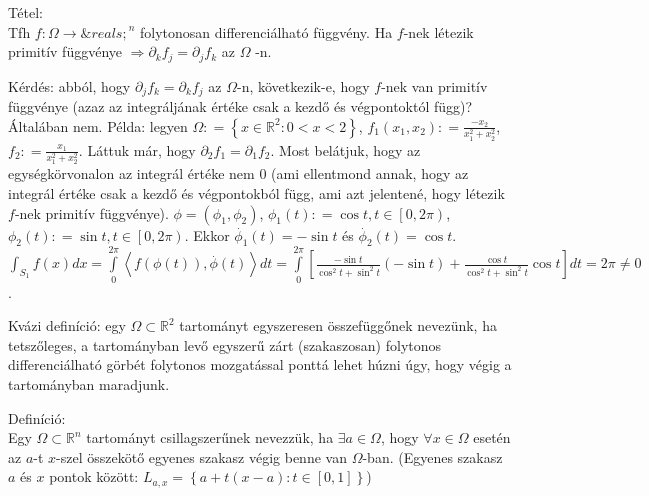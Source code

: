 \documentclass[12pt,a4paper]{scrartcl}
\newenvironment{definicio}{}{}
\newenvironment{tetel}{}{}
\begin{document}
\begin{tetel}

Tétel:\\
Tfh \(\left. f:\Omega\rightarrow{\& reals;}^{n} \right.\) folytonosan
differenciálható függvény. Ha \(f\)-nek létezik primitív függvénye
\(\left. \Rightarrow\partial_{k}f_{j} = \partial_{j}f_{k} \right.\) az
\(\Omega\) -n.

\end{tetel}

Kérdés: abból, hogy \(\partial_{j}f_{k} = \partial_{k}f_{j}\) az
\(\Omega\)-n, következik-e, hogy \(f\)-nek van primitív függvénye (azaz
az integráljának értéke csak a kezdő és végpontoktól függ)? Általában
nem. Példa: legyen
\(\Omega: = \left\{ {x \in {\mathbb{R}}^{2}:0 < x < 2} \right\}\),
\(f_{1}\left( {x_{1},x_{2}} \right): = \frac{- x_{2}}{x_{1}^{2} + x_{2}^{2}}\),
\(f_{2}: = \frac{x_{1}}{x_{1}^{2} + x_{2}^{2}}\). Láttuk már, hogy
\(\partial_{2}f_{1} = \partial_{1}f_{2}\). Most belátjuk, hogy az
egységkörvonalon az integrál értéke nem 0 (ami ellentmond annak, hogy az
integrál értéke csak a kezdő és végpontokból függ, ami azt jelentené,
hogy létezik \(f\)-nek primitív függvénye).
\(\phi = \left( {\phi_{1},\phi_{2}} \right)\),
\(\phi_{1}\left( t \right): = \cos t,t \in \left\lbrack {0,2\pi} \right)\),
\(\phi_{2}\left( t \right): = \sin t,t \in \left\lbrack {0,2\pi} \right)\).
Ekkor \({\overset{.}{\phi}}_{1}\left( t \right) = - \sin t\) és
\({\overset{.}{\phi}}_{2}\left( t \right) = \cos t\).
\({\int_{S_{1}}{f\left( x \right)dx}} = {\int\limits_{0}^{2\pi}{\left\langle {f\left( {\phi\left( t \right)} \right),\overset{.}{\phi}\left( t \right)} \right\rangle dt}} = {\int\limits_{0}^{2\pi}{\left\lbrack {\frac{- \sin t}{\cos^{2}t + \sin^{2}t}\left( {- \sin t} \right) + \frac{\cos t}{\cos^{2}t + \sin^{2}t}\cos t} \right\rbrack dt}} = 2\pi \neq 0\).

Kvázi definíció: egy \(\Omega \subset {\mathbb{R}}^{2}\) tartományt
egyszeresen összefüggőnek nevezünk, ha tetszőleges, a tartományban levő
egyszerű zárt (szakaszosan) folytonos differenciálható görbét folytonos
mozgatással ponttá lehet húzni úgy, hogy végig a tartományban maradjunk.

\begin{definicio}

Definíció:\\
Egy \(\Omega \subset {\mathbb{R}}^{n}\) tartományt csillagszerűnek
nevezzük, ha \(\exists a \in \Omega\), hogy \(\forall x \in \Omega\)
esetén az \(a\)-t \(x\)-szel összekötő egyenes szakasz végig benne van
\(\Omega\)-ban. (Egyenes szakasz \(a\) és \(x\) pontok között:
\(L_{a,x} = \left\{ {a + t\left( {x - a} \right):t \in \left\lbrack 0,1 \right\rbrack} \right\}\))

\end{definicio}
\end{document}
